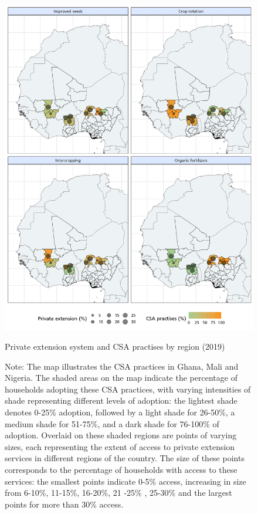 \documentclass[
]{article}
\begin{document}
\pagebreak

\clearpage

\begin{figure}[H]
\centering
\includegraphics[scale=0.6]{"figures/map_private.png"}
\caption{Private extension system and CSA practises  by region (2019)}
\caption*{Note: The map illustrates the CSA practices in Ghana, Mali and Nigeria. The shaded areas on the map indicate the percentage of households adopting these CSA practices, with varying intensities of shade representing different levels of adoption: the lightest shade denotes 0-25\% adoption, followed by a light shade for 26-50\%, a medium shade for 51-75\%, and a dark shade for 76-100\% of adoption. Overlaid on these shaded regions are points of varying sizes, each representing the extent of access to private extension services in different regions of the country. The size of these points corresponds to the percentage of households with access to these services: the smallest points indicate 0-5\% access, increasing in size from 6-10\%, 11-15\%, 16-20\%, 21 -25\% , 25-30\% and the largest points for more than 30\% access.}
\label{fig:map_1}
\end{figure}
\end{document}
